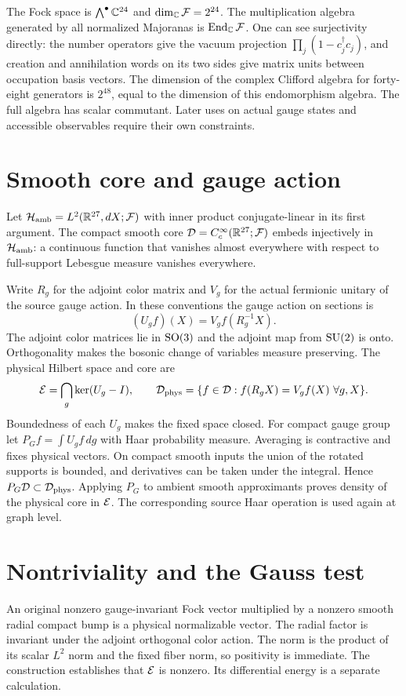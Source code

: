 The Fock space is $\bigwedge^\bullet\mathbb C^{24}$ and $\dim_\mathbb C\mathcal F=2^{24}$. The multiplication algebra generated by all normalized Majoranas is $\operatorname{End}_\mathbb C\mathcal F$. One can see surjectivity directly: the number operators give the vacuum projection $\prod_j(1-c_j^\dagger c_j)$, and creation and annihilation words on its two sides give matrix units between occupation basis vectors. The dimension of the complex Clifford algebra for forty-eight generators is $2^{48}$, equal to the dimension of this endomorphism algebra. The full algebra has scalar commutant. Later uses on actual gauge states and accessible observables require their own constraints.


\section{Smooth core and gauge action}
Let $\mathcal H_{\mathrm{amb}}=L^2(\mathbb R^{27},dX;\mathcal F)$ with inner product conjugate-linear in its first argument. The compact smooth core $\mathcal D=C_c^\infty(\mathbb R^{27};\mathcal F)$ embeds injectively in $\mathcal H_{\mathrm{amb}}$: a continuous function that vanishes almost everywhere with respect to full-support Lebesgue measure vanishes everywhere.

Write $R_g$ for the adjoint color matrix and $V_g$ for the actual fermionic unitary of the source gauge action. In these conventions the gauge action on sections is
\[
 (U_g f)(X)=V_g f(R_g^{-1}X).
\]
The adjoint color matrices lie in $\operatorname{SO}(3)$ and the adjoint map from $\operatorname{SU}(2)$ is onto. Orthogonality makes the bosonic change of variables measure preserving. The physical Hilbert space and core are
\[
 \mathcal E=\bigcap_g\ker(U_g-I),\qquad
 \mathcal D_{\mathrm{phys}}=\{f\in\mathcal D:f(R_gX)=V_g f(X)\ \forall g,X\}.
\]
Boundedness of each $U_g$ makes the fixed space closed. For compact gauge group let $P_G f=\int U_gf\,dg$ with Haar probability measure. Averaging is contractive and fixes physical vectors. On compact smooth inputs the union of the rotated supports is bounded, and derivatives can be taken under the integral. Hence $P_G\mathcal D\subset\mathcal D_{\mathrm{phys}}$. Applying $P_G$ to ambient smooth approximants proves density of the physical core in $\mathcal E$. The corresponding source Haar operation is used again at graph level.

\section{Nontriviality and the Gauss test}
An original nonzero gauge-invariant Fock vector multiplied by a nonzero smooth radial compact bump is a physical normalizable vector. The radial factor is invariant under the adjoint orthogonal color action. The norm is the product of its scalar $L^2$ norm and the fixed fiber norm, so positivity is immediate. The construction establishes that $\mathcal E$ is nonzero. Its differential energy is a separate calculation.

